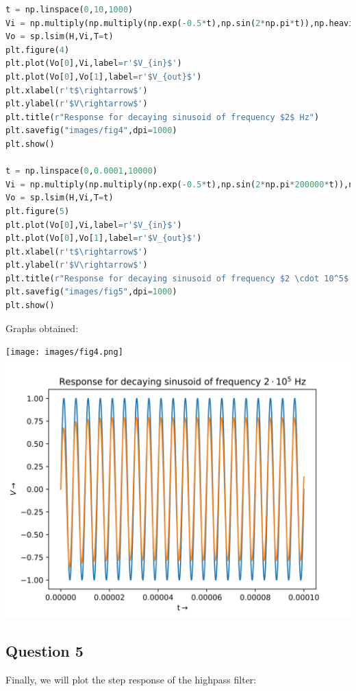 \documentclass[12pt]{article}
\begin{document}
\begin{lstlisting}[language=Python]
t = np.linspace(0,10,1000)
Vi = np.multiply(np.multiply(np.exp(-0.5*t),np.sin(2*np.pi*t)),np.heaviside(t,0.5))
Vo = sp.lsim(H,Vi,T=t)
plt.figure(4)
plt.plot(Vo[0],Vi,label=r'$V_{in}$')
plt.plot(Vo[0],Vo[1],label=r'$V_{out}$')
plt.xlabel(r't$\rightarrow$')
plt.ylabel(r'$V\rightarrow$')
plt.title(r"Response for decaying sinusoid of frequency $2$ Hz")
plt.savefig("images/fig4",dpi=1000)
plt.show()

t = np.linspace(0,0.0001,10000)
Vi = np.multiply(np.multiply(np.exp(-0.5*t),np.sin(2*np.pi*200000*t)),np.heaviside(t,0.5))
Vo = sp.lsim(H,Vi,T=t)
plt.figure(5)
plt.plot(Vo[0],Vi,label=r'$V_{in}$')
plt.plot(Vo[0],Vo[1],label=r'$V_{out}$')
plt.xlabel(r't$\rightarrow$')
plt.ylabel(r'$V\rightarrow$')
plt.title(r"Response for decaying sinusoid of frequency $2 \cdot 10^5$ Hz")
plt.savefig("images/fig5",dpi=1000)
plt.show()
\end{lstlisting}
\pagebreak
Graphs obtained:
\begin{center}
    \texttt{[image: images/fig4.png]}
    \includegraphics[scale=0.8]{images/fig5.png}
\end{center}

\pagebreak
\subsection{Question 5}

Finally, we will plot the step response of the highpass filter:
\end{document}

